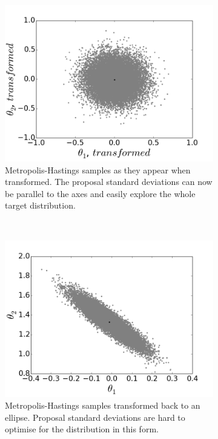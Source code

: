 \documentclass[a4paper,11pt,twoside]{article}
\begin{document}
\begin{figure}[!ht]
	\centering
	\begin{subfigure}[t]{0.4\linewidth}
		\centering
		\includegraphics[width=\textwidth]{rot.png}
		\caption{Metropolis-Hastings samples as they appear when
		transformed. The proposal standard deviations can now be parallel to
		the axes and easily explore the whole target distribution.}
		\label{fig:rot}
	\end{subfigure}
	~
	\begin{subfigure}[t]{0.4\linewidth}
		\centering
		\includegraphics[width=\textwidth]{unrot.png}
		\caption{Metropolis-Hastings samples transformed back to
		an ellipse. Proposal standard deviations are hard to optimise
		for the distribution in this form. }
		\label{fig:unrot}
	\end{subfigure}
	\caption{}\label{fig:rot-unrot}
\end{figure}
\end{document}
